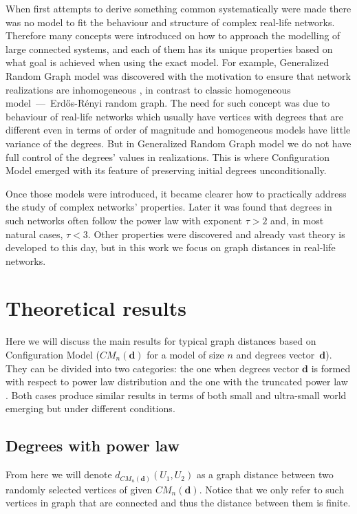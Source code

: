 \documentclass[a4paper]{article}
\begin{document}
When first attempts to derive something common systematically were made there was no model to fit the behaviour and structure of complex real-life networks. Therefore many concepts were introduced on how to approach the modelling of large connected systems, and each of them has its unique properties based on what goal is achieved when using the exact model. For example, Generalized Random Graph model was discovered with the motivation to ensure that network realizations are inhomogeneous \cite{book_1}, in contrast to classic homogeneous model~---~Erd\H{o}s-R\'{e}nyi random graph. The need for such concept was due to behaviour of real-life networks which usually have vertices with degrees that are different even in terms of order of magnitude and homogeneous models have little variance of the degrees. But in Generalized Random Graph model we do not have full control of the degrees' values in realizations. This is where Configuration Model emerged with its feature of preserving initial degrees unconditionally.

Once those models were introduced, it became clearer how to practically address the study of complex networks' properties. Later it was found that degrees in such networks often follow the power law with exponent $\tau > 2$ and, in most natural cases, $\tau < 3$. Other properties were discovered and already vast theory is developed to this day, but in this work we focus on graph distances in real-life networks.

\section{Theoretical results}

Here we will discuss the main results for typical graph distances based on Configuration Model ($CM_n({\mathbf d})$ for a model of size $n$ and degrees vector~${\mathbf d}$). They can be divided into two categories: the one when degrees vector ${\mathbf d}$ is formed with respect to power law distribution and the one with the truncated power law \cite{paper}. Both cases produce similar results in terms of both small and ultra-small world emerging but under different conditions.

\subsection{Degrees with power law}

From here we will denote $d_{CM_n({\mathbf d})}(U_1, U_2)$ as a graph distance between two randomly selected vertices of given $CM_n({\mathbf d})$. Notice that we only refer to such vertices in graph that are connected and thus the distance between them is finite.
\end{document}

